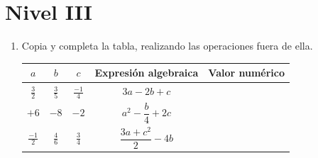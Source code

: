 \documentclass[10pt,twoside]{article}
\begin{document}
\section*{Nivel III}
\begin{enumerate}
 \item Copia y completa la tabla, realizando las operaciones fuera de ella.
 \begin{center}
\begin{tabular}{|c|c|c|c|c|}\hline
$a$ & $b$ & $c$ & Expresión algebraica & Valor numérico \\ \hline
$\frac{3}{2}$ & $\frac{3}{5}$ & $\frac{-1}{4}$ & $3a-2b+c$ & \rule[-0.3cm]{0cm}{0.8cm}\\ \hline
$+6$ & $-8$ & $-2$ & $a^{2}-\dfrac{b}{4}+2c$ & \rule[-0.3cm]{0cm}{0.8cm} \\ \hline
$\frac{-1}{2}$ & $\frac{4}{6}$ & $\frac{3}{4}$ & $\dfrac{3a+c^{2}}{2}-4b$ & \rule[-0.3cm]{0cm}{0.8cm} \\ \hline
 \end{tabular}
 \end{center}

\end{enumerate}
\end{document}
